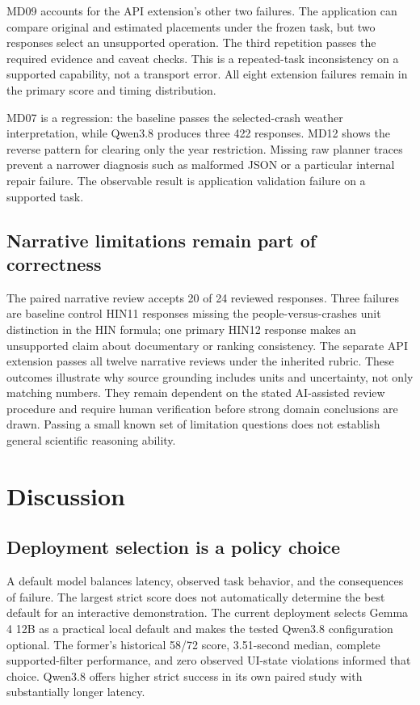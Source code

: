 \documentclass[10pt,twocolumn,letterpaper]{article}
\begin{document}
MD09 accounts for the API extension's other two failures. The application can compare original and estimated placements under the frozen task, but two responses select an unsupported operation. The third repetition passes the required evidence and caveat checks. This is a repeated-task inconsistency on a supported capability, not a transport error. All eight extension failures remain in the primary score and timing distribution.

MD07 is a regression: the baseline passes the selected-crash weather interpretation, while Qwen3.8 produces three 422 responses. MD12 shows the reverse pattern for clearing only the year restriction. Missing raw planner traces prevent a narrower diagnosis such as malformed JSON or a particular internal repair failure. The observable result is application validation failure on a supported task.

\subsection{Narrative limitations remain part of correctness}
The paired narrative review accepts 20 of 24 reviewed responses. Three failures are baseline control HIN11 responses missing the people-versus-crashes unit distinction in the HIN formula; one primary HIN12 response makes an unsupported claim about documentary or ranking consistency. The separate API extension passes all twelve narrative reviews under the inherited rubric. These outcomes illustrate why source grounding includes units and uncertainty, not only matching numbers. They remain dependent on the stated AI-assisted review procedure and require human verification before strong domain conclusions are drawn. Passing a small known set of limitation questions does not establish general scientific reasoning ability.

\section{Discussion}
\subsection{Deployment selection is a policy choice}
A default model balances latency, observed task behavior, and the consequences of failure. The largest strict score does not automatically determine the best default for an interactive demonstration. The current deployment selects Gemma 4 12B as a practical local default and makes the tested Qwen3.8 configuration optional. The former's historical 58/72 score, 3.51-second median, complete supported-filter performance, and zero observed UI-state violations informed that choice. Qwen3.8 offers higher strict success in its own paired study with substantially longer latency.
\end{document}
